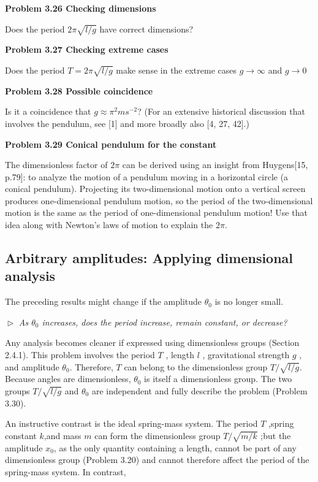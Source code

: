 \documentclass [a4paper] {book}
\begin{document}
\textbf{Problem 3.26 Checking dimensions} 

\noindent Does the period $2\pi \sqrt{l/g}$ have correct dimensions? 

\noindent \textbf{Problem 3.27 Checking extreme cases} 

\noindent Does the period $T = 2\pi\sqrt{l/g}$ make sense in the extreme cases $g \to \infty$ and $g \to 0$ 

\noindent \textbf{Problem 3.28 Possible coincidence} 

\noindent Is it a coincidence that $g\approx {\pi}^{2} ms^{-2}$? (For an extensive historical discussion that involves the pendulum, see [1] and more broadly also [4, 27, 42].)

\noindent \textbf{Problem 3.29 Conical pendulum for the constant}

\noindent The dimensionless factor of $2\pi$ can be derived using an insight from Huygens[15, p.79]: to analyze the motion of a pendulum moving in a horizontal circle (a conical pendulum). Projecting its two-dimensional motion onto a vertical screen produces one-dimensional pendulum motion, so the period of the two-dimensional motion is the same as the period of one-dimensional pendulum motion! Use that idea along with Newton’s laws of motion to explain the $2\pi$.
\subsection{\textbf{ Arbitrary amplitudes: Applying dimensional analysis}} 
The preceding results might change if the amplitude $\theta_0$ is no longer small. 

\noindent $\vartriangleright$ \textit{As $\theta_0$ increases, does the period increase, remain constant, or decrease?}

\noindent Any analysis becomes cleaner if expressed using dimensionless groups (Section 2.4.1). This problem involves the period $T$ , length $l$ , gravitational strength $g$ , and amplitude $\theta_0$. Therefore, $T$ can belong to the dimensionless group $T/\sqrt{l/g}$. Because angles are dimensionless, $\theta_0$ is itself a dimensionless group. The two groups $T/\sqrt{l/g}$ and $\theta_0$ are independent and fully describe the problem (Problem 3.30). 

\noindent An instructive contrast is the ideal spring-mass system. The period $T$ ,spring constant $k$,and mass $m$ can form the dimensionless group $T/\sqrt{m/k} $ ;but the amplitude $x_0$, as the only quantity containing a length, cannot be part of any dimensionless group (Problem 3.20) and cannot therefore affect the period of the spring-mass system. In contrast,
\end{document}
